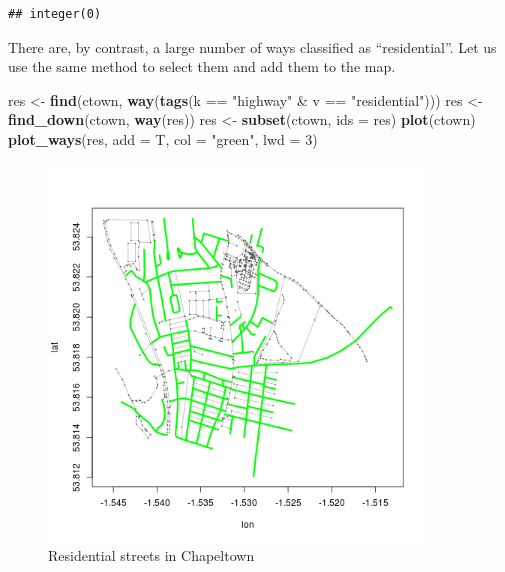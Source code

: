 \documentclass[]{article}
\newenvironment{Shaded}{}{}
\newcommand{\KeywordTok}[1]{\textcolor[rgb]{0.00,0.44,0.13}{\textbf{{#1}}}}
\newcommand{\DataTypeTok}[1]{\textcolor[rgb]{0.56,0.13,0.00}{{#1}}}
\newcommand{\DecValTok}[1]{\textcolor[rgb]{0.25,0.63,0.44}{{#1}}}
\newcommand{\StringTok}[1]{\textcolor[rgb]{0.25,0.44,0.63}{{#1}}}
\newcommand{\NormalTok}[1]{{#1}}
\let\Oldincludegraphics\includegraphics
\renewcommand{\includegraphics}[1]{\Oldincludegraphics[width=10cm]{#1}}
\begin{document}
\begin{Shaded}
\end{Shaded}
\begin{verbatim}
## integer(0)
\end{verbatim}
There are, by contrast, a large number of ways classified as
``residential''. Let us use the same method to select them and add them
to the map.

\begin{Shaded}
\begin{Highlighting}[]
\NormalTok{res <- }\KeywordTok{find}\NormalTok{(ctown, }\KeywordTok{way}\NormalTok{(}\KeywordTok{tags}\NormalTok{(k == }\StringTok{"highway"} \NormalTok{& v == }\StringTok{"residential"}\NormalTok{)))}
\NormalTok{res <- }\KeywordTok{find_down}\NormalTok{(ctown, }\KeywordTok{way}\NormalTok{(res))}
\NormalTok{res <- }\KeywordTok{subset}\NormalTok{(ctown, }\DataTypeTok{ids =} \NormalTok{res)}
\KeywordTok{plot}\NormalTok{(ctown)}
\KeywordTok{plot_ways}\NormalTok{(res, }\DataTypeTok{add =} \NormalTok{T, }\DataTypeTok{col =} \StringTok{"green"}\NormalTok{, }\DataTypeTok{lwd =} \DecValTok{3}\NormalTok{)}
\end{Highlighting}
\end{Shaded}
\begin{figure}[htbp]
\centering
\includegraphics{figure/Residential_streets_in_Chapeltown.png}
\caption{Residential streets in Chapeltown}
\end{figure}
\end{document}

